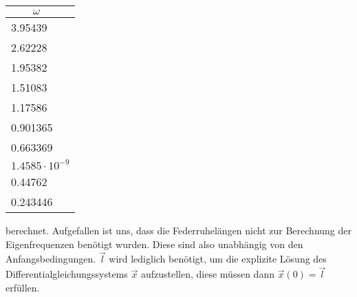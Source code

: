 \FloatBarrier
\begin{table}[h]
    \centering
    \begin{tabular}{l}
        \textbf{$\qquad \omega$} \\
        \toprule 3.95439 \\ 2.62228 \\ 1.95382 \\ 1.51083 \\ 1.17586 \\ 0.901365 \\ 0.663369 \\ $1.4585\cdot 10^{-9}$ \\ 0.44762 \\ 0.243446 \\
        \bottomrule
    \end{tabular}
\end{table}
\noindent
\FloatBarrier
\noindent
berechnet. Aufgefallen ist uns, dass die Federruhelängen nicht zur Berechnung der Eigenfrequenzen benötigt wurden. Diese sind also unabhängig von den Anfangsbedingungen. $\vec{l}$ wird lediglich benötigt, um die explizite Lösung des Differentialgleichungssystems $\vec{x}$ aufzustellen, diese müssen dann $\vec{x}(0) = \vec{l}$ erfüllen.

